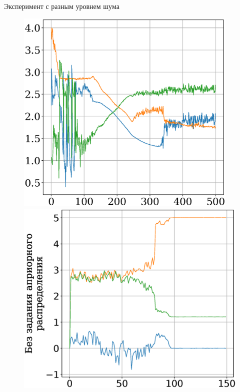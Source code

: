 \documentclass[10pt,pdf,hyperref={unicode}]{beamer}
\begin{document}
\begin{frame}{Эксперимент с разным уровнем шума}
\begin{figure}[h]
\begin{minipage}{.32\textwidth}
\end{minipage}
\begin{minipage}{.32\textwidth}
\vspace{2pt}
\hspace{-6.3mm}
      \includegraphics[width = 0.95\textwidth]{figures/912noise.eps}
\end{minipage}
\begin{minipage}{.32\textwidth}
\hspace{-3mm}
      \includegraphics[width = 1.05\textwidth]{figures/900noise.eps}

\end{minipage}
\end{figure}
\end{frame}
\end{document}
